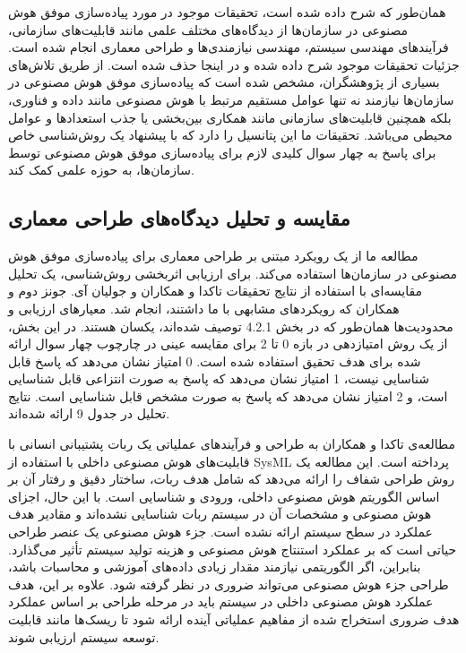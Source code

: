 \documentclass[a4paper,10pt]{article}
\begin{document}
            همان‌طور که شرح داده شده است، تحقیقات موجود در مورد پیاده‌سازی موفق هوش مصنوعی در سازمان‌ها از دیدگاه‌های مختلف علمی مانند قابلیت‌های سازمانی، فرآیندهای مهندسی سیستم، مهندسی نیازمندی‌ها و طراحی معماری انجام شده است. جزئیات تحقیقات موجود شرح داده شده و در اینجا حذف شده است. از طریق تلاش‌های بسیاری از پژوهشگران، مشخص شده است که پیاده‌سازی موفق هوش مصنوعی در سازمان‌ها نیازمند نه تنها عوامل مستقیم مرتبط با هوش مصنوعی مانند داده و فناوری، بلکه همچنین قابلیت‌های سازمانی مانند همکاری بین‌بخشی یا جذب استعدادها و عوامل محیطی می‌باشد. تحقیقات ما این پتانسیل را دارد که با پیشنهاد یک روش‌شناسی خاص برای پاسخ به چهار سوال کلیدی لازم برای پیاده‌سازی موفق هوش مصنوعی توسط سازمان‌ها، به حوزه علمی کمک کند.

        \subsection{مقایسه و تحلیل دیدگاه‌های طراحی معماری}

            مطالعه ما از یک رویکرد مبتنی بر طراحی معماری برای پیاده‌سازی موفق هوش مصنوعی در سازمان‌ها استفاده می‌کند. برای ارزیابی اثربخشی روش‌شناسی، یک تحلیل مقایسه‌ای با استفاده از نتایج تحقیقات تاکدا و همکاران و جولیان آی. جونز دوم و همکاران که رویکردهای مشابهی با ما داشتند، انجام شد. معیارهای ارزیابی و محدودیت‌ها همان‌طور که در بخش 4.2.1 توصیف شده‌اند، یکسان هستند. در این بخش، از یک روش امتیازدهی در بازه 0 تا 2 برای مقایسه عینی در چارچوب چهار سوال ارائه شده برای هدف تحقیق استفاده شده است. 0 امتیاز نشان می‌دهد که پاسخ قابل شناسایی نیست، 1 امتیاز نشان می‌دهد که پاسخ به صورت انتزاعی قابل شناسایی است، و 2 امتیاز نشان می‌دهد که پاسخ به صورت مشخص قابل شناسایی است. نتایج تحلیل در جدول 9 ارائه شده‌اند.

            مطالعه‌ی تاکدا و همکاران به طراحی و فرآیندهای عملیاتی یک ربات پشتیبانی انسانی با قابلیت‌های هوش مصنوعی داخلی با استفاده از SysML پرداخته است. این مطالعه یک روش طراحی شفاف را ارائه می‌دهد که شامل هدف ربات، ساختار دقیق و رفتار آن بر اساس الگوریتم هوش مصنوعی داخلی، ورودی و شناسایی است. با این حال، اجزای هوش مصنوعی و مشخصات آن در سیستم ربات شناسایی نشده‌اند و مقادیر هدف عملکرد در سطح سیستم ارائه نشده است. جزء هوش مصنوعی یک عنصر طراحی حیاتی است که بر عملکرد استنتاج هوش مصنوعی و هزینه تولید سیستم تأثیر می‌گذارد. بنابراین، اگر الگوریتمی نیازمند مقدار زیادی داده‌های آموزشی و محاسبات باشد، طراحی جزء هوش مصنوعی می‌تواند ضروری در نظر گرفته شود. علاوه بر این، هدف عملکرد هوش مصنوعی داخلی در سیستم باید در مرحله طراحی بر اساس عملکرد هدف ضروری استخراج شده از مفاهیم عملیاتی آینده ارائه شود تا ریسک‌ها مانند قابلیت توسعه سیستم ارزیابی شوند.
\end{document}
